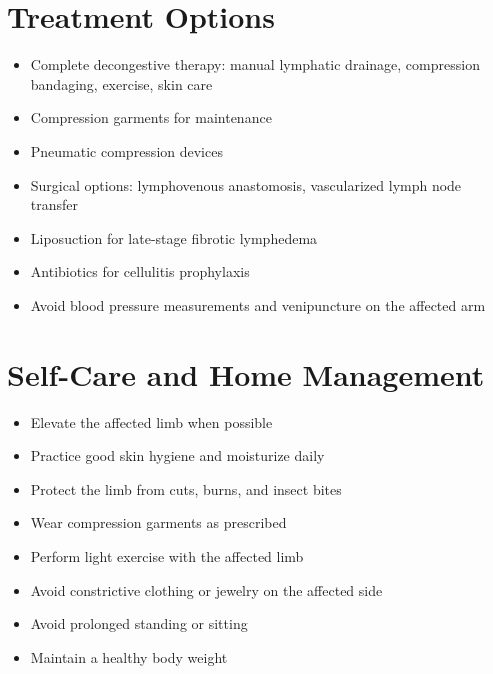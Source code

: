 \section*{Treatment Options}
\begin{itemize}
\item Complete decongestive therapy: manual lymphatic drainage, compression bandaging, exercise, skin care
\item Compression garments for maintenance
\item Pneumatic compression devices
\item Surgical options: lymphovenous anastomosis, vascularized lymph node transfer
\item Liposuction for late-stage fibrotic lymphedema
\item Antibiotics for cellulitis prophylaxis
\item Avoid blood pressure measurements and venipuncture on the affected arm
\end{itemize}

\section*{Self-Care and Home Management}
\begin{itemize}
\item Elevate the affected limb when possible
\item Practice good skin hygiene and moisturize daily
\item Protect the limb from cuts, burns, and insect bites
\item Wear compression garments as prescribed
\item Perform light exercise with the affected limb
\item Avoid constrictive clothing or jewelry on the affected side
\item Avoid prolonged standing or sitting
\item Maintain a healthy body weight
\end{itemize}

